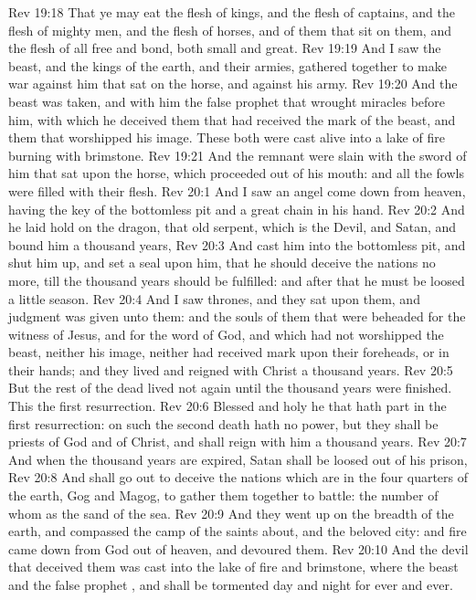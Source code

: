\vs Rev 19:18 That ye may eat the flesh of kings, and the flesh of captains, and the flesh of mighty men, and the flesh of horses, and of them that sit on them, and the flesh of all  free and bond, both small and great.
\vs Rev 19:19 And I saw the beast, and the kings of the earth, and their armies, gathered together to make war against him that sat on the horse, and against his army.
\vs Rev 19:20 And the beast was taken, and with him the false prophet that wrought miracles before him, with which he deceived them that had received the mark of the beast, and them that worshipped his image. These both were cast alive into a lake of fire burning with brimstone.
\vs Rev 19:21 And the remnant were slain with the sword of him that sat upon the horse, which  proceeded out of his mouth: and all the fowls were filled with their flesh.
\vs Rev 20:1 And I saw an angel come down from heaven, having the key of the bottomless pit and a great chain in his hand.
\vs Rev 20:2 And he laid hold on the dragon, that old serpent, which is the Devil, and Satan, and bound him a thousand years,
\vs Rev 20:3 And cast him into the bottomless pit, and shut him up, and set a seal upon him, that he should deceive the nations no more, till the thousand years should be fulfilled: and after that he must be loosed a little season.
\vs Rev 20:4 And I saw thrones, and they sat upon them, and judgment was given unto them: and  the souls of them that were beheaded for the witness of Jesus, and for the word of God, and which had not worshipped the beast, neither his image, neither had received  mark upon their foreheads, or in their hands; and they lived and reigned with Christ a thousand years.
\vs Rev 20:5 But the rest of the dead lived not again until the thousand years were finished. This  the first resurrection.
\vs Rev 20:6 Blessed and holy  he that hath part in the first resurrection: on such the second death hath no power, but they shall be priests of God and of Christ, and shall reign with him a thousand years.
\vs Rev 20:7 And when the thousand years are expired, Satan shall be loosed out of his prison,
\vs Rev 20:8 And shall go out to deceive the nations which are in the four quarters of the earth, Gog and Magog, to gather them together to battle: the number of whom  as the sand of the sea.
\vs Rev 20:9 And they went up on the breadth of the earth, and compassed the camp of the saints about, and the beloved city: and fire came down from God out of heaven, and devoured them.
\vs Rev 20:10 And the devil that deceived them was cast into the lake of fire and brimstone, where the beast and the false prophet , and shall be tormented day and night for ever and ever.
